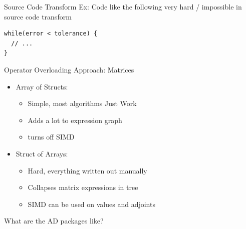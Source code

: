 \documentclass[dvipsnames]{beamer}
\begin{document}
\begin{frame}[fragile]{Source Code Transform Ex:}
Code like the following very hard / impossible in source code transform
\begin{verbatim}
while(error < tolerance) {
  // ...
}
\end{verbatim}
\end{frame}

\begin{frame}{Operator Overloading Approach: Matrices}
\begin{itemize}
    \item Array of Structs:
    \begin{itemize}
        \item Simple, most algorithms Just Work\texttrademark
        \item Adds a lot to expression graph
        \item turns off SIMD
    \end{itemize}
    \item Struct of Arrays:
    \begin{itemize}
        \item Hard, everything written out manually
        \item Collapses matrix expressions in tree
        \item SIMD can be used on values and adjoints
    \end{itemize}
\end{itemize}
\end{frame}



\begin{frame}{What are the AD packages like?}
\centering
\end{frame}
\end{document}
